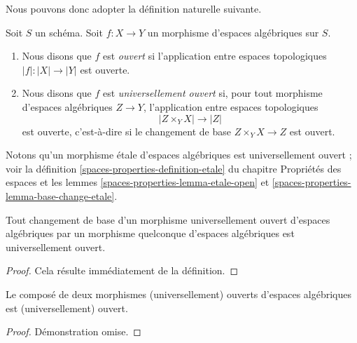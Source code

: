 \noindent
Nous pouvons donc adopter la définition naturelle suivante.

\begin{definition}
\label{definition-open}
Soit $S$ un schéma. Soit $f : X \to Y$ un morphisme d'espaces algébriques
sur $S$.
\begin{enumerate}
\item Nous disons que $f$ est {\it ouvert} si l'application entre espaces topologiques
$|f| : |X| \to |Y|$ est ouverte.
\item Nous disons que $f$ est {\it universellement ouvert} si, pour tout morphisme
d'espaces algébriques $Z \to Y$, l'application entre espaces topologiques
$$
|Z \times_Y X| \to |Z|
$$
est ouverte, c'est-à-dire si le changement de base $Z \times_Y X \to Z$ est ouvert.
\end{enumerate}
\end{definition}

\noindent
Notons qu'un morphisme \'etale d'espaces algébriques est universellement ouvert ;
voir la
définition \ref{spaces-properties-definition-etale} du chapitre Propriétés des espaces et les
lemmes \ref{spaces-properties-lemma-etale-open} et
\ref{spaces-properties-lemma-base-change-etale}.

\begin{lemma}
\label{lemma-base-change-universally-open}
Tout changement de base d'un morphisme universellement ouvert d'espaces algébriques
par un morphisme quelconque d'espaces algébriques est universellement ouvert.
\end{lemma}

\begin{proof}
Cela résulte immédiatement de la définition.
\end{proof}

\begin{lemma}
\label{lemma-composition-open}
Le composé de deux morphismes (universellement) ouverts d'espaces algébriques
est (universellement) ouvert.
\end{lemma}

\begin{proof}
Démonstration omise.
\end{proof}

